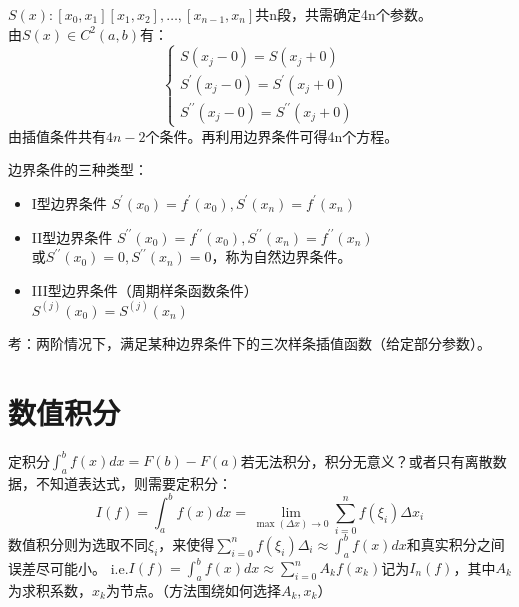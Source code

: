 \documentclass[a4paper]{article}
\begin{document}
$S(x): [x_0, x_1][x_1,x_2],\dots, [x_{n-1},x_n] $共n段，共需确定4n个参数。\\
由$S(x)\in C^2(a,b)$有：
\begin{equation*}
    \left\{
    \begin{array}{lr}
        S(x_j-0) = S(x_j+0) \\
        S^{'}(x_j-0) = S^{'}(x_j+0) \\
        S^{{'}{'}}(x_j-0) = S^{{'}{'}}(x_j+0)
    \end{array}\right.
\end{equation*}
由插值条件共有$4n-2$个条件。再利用边界条件可得4n个方程。

边界条件的三种类型：
\begin{itemize}
    \item I型边界条件 $S^{'}(x_0)=f^{'}(x_0), S^{'}(x_n)=f^{'}(x_n) $
    \item II型边界条件 $S^{{'}{'}}(x_0)=f^{{'}{'}}(x_0), S^{{'}{'}}(x_n)=f^{{'}{'}}(x_n) $\\
        或$S^{{'}{'}}(x_0)=0, S^{{'}{'}}(x_n)=0 $，称为自然边界条件。
    \item III型边界条件（周期样条函数条件）\\
        $S^{(j)}(x_0)=S^{(j)}(x_n) $
\end{itemize}

考：两阶情况下，满足某种边界条件下的三次样条插值函数（给定部分参数）。

\section{数值积分}

定积分$\int^b_a f(x)dx=F(b)-F(a) $若无法积分，积分无意义？或者只有离散数据，不知道表达式，则需要定积分：
\begin{equation}
    I(f) = \int^b_af(x)dx = \lim_{\max(\Delta x)\rightarrow 0}\sum^n_{i=0}f(\xi_i)\Delta x_i
\end{equation}
数值积分则为选取不同$\xi_i$，来使得$\sum^n_{i=0}f(\xi_i)\Delta_i \approx \int^b_af(x)dx $和真实积分之间误差尽可能小。
i.e.$I(f)=\int^b_af(x)dx\approx \sum^n_{i=0}A_kf(x_k)$记为$I_n(f)$，其中$A_k$为求积系数，$x_k$为节点。（方法围绕如何选择$A_k, x_k$）
\end{document}
